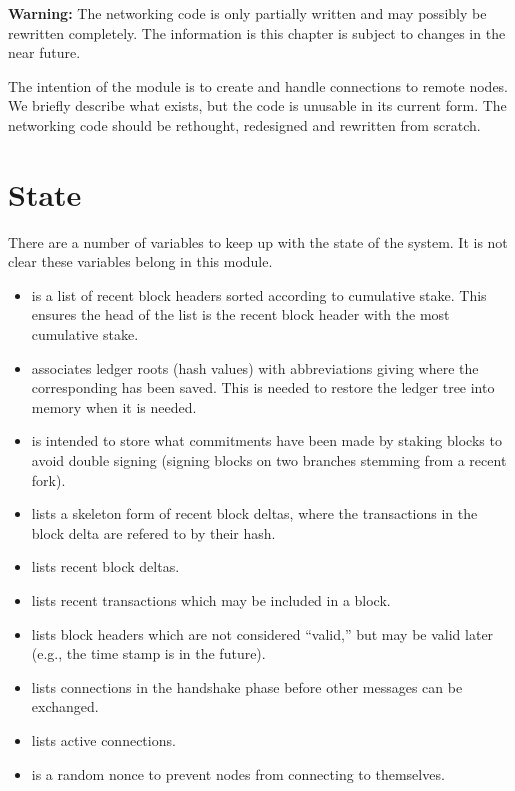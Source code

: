 {\bf{Warning:}} The networking code is only partially written and may possibly be rewritten completely.
The information is this chapter is subject to changes in the near future.

The intention of the {} module is to create and handle connections
to remote nodes.
We briefly describe what exists, but the code is unusable in its current form.
The networking code should be rethought, redesigned and rewritten from scratch.

\section{State}

There are a number of variables to keep up with the state of the system.
It is not clear these variables belong in this module.
\begin{itemize}
\item {} is a list of recent block headers sorted according to cumulative stake.
This ensures the head of the list is the recent block header with the most cumulative stake.
\item {} associates ledger roots (hash values) with abbreviations giving where the corresponding {} has been saved. This is needed to restore the ledger tree into memory when it is needed.
\item {} is intended to store what commitments have been made by staking blocks to avoid double signing (signing blocks on two branches stemming from a recent fork).
\item {} lists a skeleton form of recent block deltas, where the transactions in the block delta are refered to by their hash.
\item {} lists recent block deltas.
\item {} lists recent transactions which may be included in a block.
\item {} lists block headers which are not considered ``valid,'' but may be valid later (e.g., the time stamp is in the future).
\item {} lists connections in the handshake phase before other messages can be exchanged.
\item {} lists active connections.
\item {} is a random nonce to prevent nodes from connecting to themselves.
\end{itemize}

